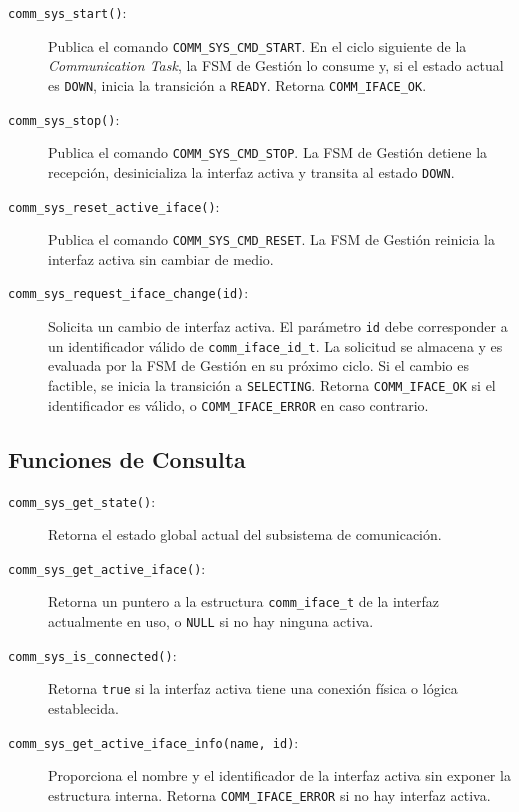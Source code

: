\begin{description}
      \item[\texttt{comm\_sys\_start()}:] Publica el comando \texttt{COMM\_SYS\_CMD\_START}. En el ciclo siguiente de la \textit{Communication Task}, la FSM de Gestión lo consume y, si el estado actual es \texttt{DOWN}, inicia la transición a \texttt{READY}. Retorna \texttt{COMM\_IFACE\_OK}.
      \item[\texttt{comm\_sys\_stop()}:] Publica el comando \texttt{COMM\_SYS\_CMD\_STOP}. La FSM de Gestión detiene la recepción, desinicializa la interfaz activa y transita al estado \texttt{DOWN}.
      \item[\texttt{comm\_sys\_reset\_active\_iface()}:] Publica el comando \texttt{COMM\_SYS\_CMD\_RESET}. La FSM de Gestión reinicia la interfaz activa sin cambiar de medio.
      \item[\texttt{comm\_sys\_request\_iface\_change(id)}:] Solicita un cambio de interfaz activa. El parámetro \texttt{id} debe corresponder a un identificador válido de \texttt{comm\_iface\_id\_t}. La solicitud se almacena y es evaluada por la FSM de Gestión en su próximo ciclo. Si el cambio es factible, se inicia la transición a \texttt{SELECTING}. Retorna \texttt{COMM\_IFACE\_OK} si el identificador es válido, o \texttt{COMM\_IFACE\_ERROR} en caso contrario.
\end{description}

\subsection{Funciones de Consulta}
\label{subsec:sys-consulta}

\begin{description}
    \item[\texttt{comm\_sys\_get\_state()}:] Retorna el estado global actual del subsistema de comunicación.
    \item[\texttt{comm\_sys\_get\_active\_iface()}:] Retorna un puntero a la estructura \texttt{comm\_iface\_t} de la interfaz actualmente en uso, o \texttt{NULL} si no hay ninguna activa.
    \item[\texttt{comm\_sys\_is\_connected()}:] Retorna \texttt{true} si la interfaz activa tiene una conexión física o lógica establecida.
    \item[\texttt{comm\_sys\_get\_active\_iface\_info(name, id)}:] Proporciona el nombre y el identificador de la interfaz activa sin exponer la estructura interna. Retorna \texttt{COMM\_IFACE\_ERROR} si no hay interfaz activa.
\end{description}


